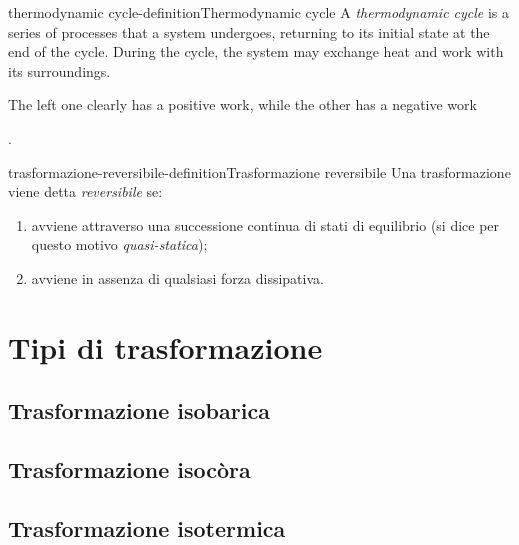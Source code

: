 \documentclass[preview]{standalone}
\begin{document}
\begin{snippetdefinition}{thermodynamic cycle-definition}{Thermodynamic cycle}
    A \emph{thermodynamic cycle} is a series of processes that a system undergoes,
    returning to its initial state at the end of the cycle.
    During the cycle, the system may exchange heat and work with its surroundings.
\end{snippetdefinition}


\begin{plainhtml}
    The left one clearly has a positive work, while the other has a negative work
\end{plainhtml}.

\begin{snippetdefinition}{trasformazione-reversibile-definition}{Trasformazione reversibile}
    Una trasformazione viene detta \emph{reversibile} se:
    \begin{enumerate}
        \item avviene attraverso una successione
        continua di stati di equilibrio (si dice per questo motivo \emph{quasi-statica});
        \item avviene in assenza di qualsiasi forza dissipativa.
    \end{enumerate}
\end{snippetdefinition}

\section{Tipi di trasformazione}

\subsection{Trasformazione isobarica}


\subsection{Trasformazione isocòra}


\subsection{Trasformazione isotermica}
\end{document}
